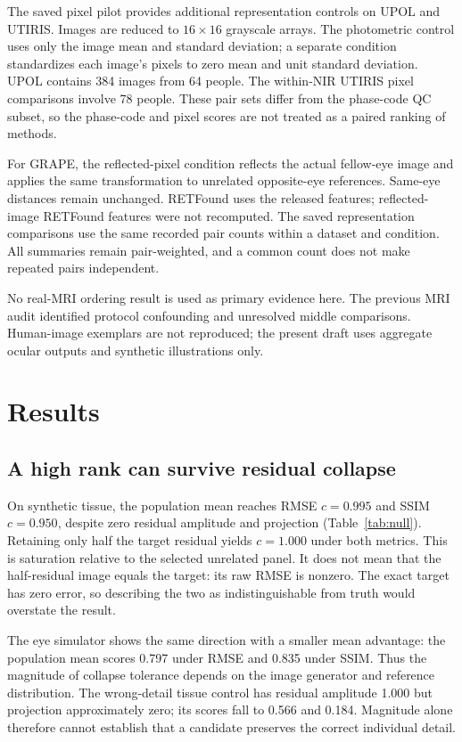 \documentclass[10pt,twocolumn,letterpaper]{article}
\begin{document}
The saved pixel pilot provides additional representation controls on UPOL and UTIRIS. Images are reduced to $16\times16$ grayscale arrays. The photometric control uses only the image mean and standard deviation; a separate condition standardizes each image's pixels to zero mean and unit standard deviation. UPOL contains 384 images from 64 people. The within-NIR UTIRIS pixel comparisons involve 78 people. These pair sets differ from the phase-code QC subset, so the phase-code and pixel scores are not treated as a paired ranking of methods.

For GRAPE, the reflected-pixel condition reflects the actual fellow-eye image and applies the same transformation to unrelated opposite-eye references. Same-eye distances remain unchanged. RETFound uses the released features; reflected-image RETFound features were not recomputed. The saved representation comparisons use the same recorded pair counts within a dataset and condition. All summaries remain pair-weighted, and a common count does not make repeated pairs independent.

No real-MRI ordering result is used as primary evidence here. The previous MRI audit identified protocol confounding and unresolved middle comparisons. Human-image exemplars are not reproduced; the present draft uses aggregate ocular outputs and synthetic illustrations only.

\section{Results}
\subsection{A high rank can survive residual collapse}
On synthetic tissue, the population mean reaches RMSE $c=0.995$ and SSIM $c=0.950$, despite zero residual amplitude and projection (Table~\ref{tab:null}). Retaining only half the target residual yields $c=1.000$ under both metrics. This is saturation relative to the selected unrelated panel. It does not mean that the half-residual image equals the target: its raw RMSE is nonzero. The exact target has zero error, so describing the two as indistinguishable from truth would overstate the result.

The eye simulator shows the same direction with a smaller mean advantage: the population mean scores 0.797 under RMSE and 0.835 under SSIM. Thus the magnitude of collapse tolerance depends on the image generator and reference distribution. The wrong-detail tissue control has residual amplitude 1.000 but projection approximately zero; its scores fall to 0.566 and 0.184. Magnitude alone therefore cannot establish that a candidate preserves the correct individual detail.
\end{document}
